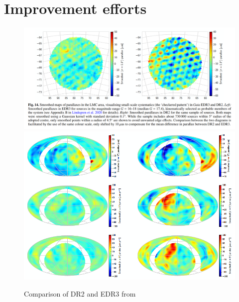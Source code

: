 \documentclass[twocolumn]{aastex631}
\begin{document}
\section{Improvement efforts} \label{sec:improvement}

\begin{figure}
	\includegraphics[width=\columnwidth]{lmcDR2vsDR3.png}
	\includegraphics[width=\columnwidth]{quasar.png}
	\caption{Comparison of DR2 and EDR3 from \cite{lindegrenGaia2021a}}
\end{figure}
\end{document}
